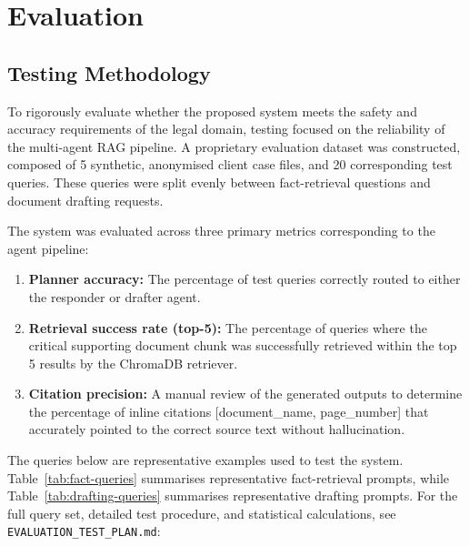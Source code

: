 \documentclass[11pt,a4paper]{article}
\begin{document}
\section{Evaluation}
\label{sec:evaluation}

\subsection{Testing Methodology}

To rigorously evaluate whether the proposed system meets the safety and accuracy requirements of the legal domain, testing focused on the reliability of the multi-agent RAG pipeline. A proprietary evaluation dataset was constructed, composed of 5 synthetic, anonymised client case files, and 20 corresponding test queries. These queries were split evenly between fact-retrieval questions and document drafting requests.

The system was evaluated across three primary metrics corresponding to the agent pipeline:
\begin{enumerate}
\item \textbf{Planner accuracy:} The percentage of test queries correctly routed to either the responder or drafter agent.
\item \textbf{Retrieval success rate (top-5):} The percentage of queries where the critical supporting document chunk was successfully retrieved within the top 5 results by the ChromaDB retriever.
\item \textbf{Citation precision:} A manual review of the generated outputs to determine the percentage of inline citations [document\_name, page\_number] that accurately pointed to the correct source text without hallucination.
\end{enumerate}

The queries below are representative examples used to test the system. Table~\ref{tab:fact-queries} summarises representative fact-retrieval prompts, while Table~\ref{tab:drafting-queries} summarises representative drafting prompts. For the full query set, detailed test procedure, and statistical calculations, see \texttt{EVALUATION\_TEST\_PLAN.md}:
\end{document}
